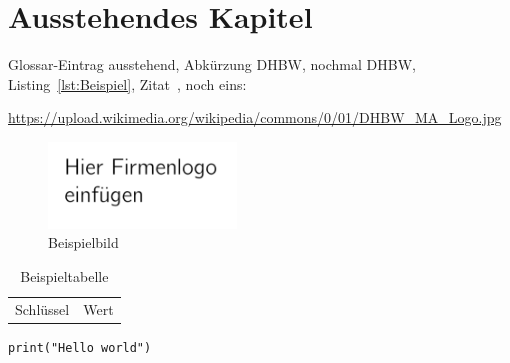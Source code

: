 \section{Ausstehendes Kapitel}

Glossar\hyp{}Eintrag \gls{ausstehend}, Abkürzung \ac{DHBW}, nochmal \ac{DHBW}, Listing~\ref{lst:Beispiel}, Zitat~\parencite[vgl.][S.~1\psq]{BookKey}, noch eins: \cite{OnlineKey}

\begin{sloppypar}
\url{https://upload.wikimedia.org/wikipedia/commons/0/01/DHBW_MA_Logo.jpg}
\end{sloppypar}

\begin{figure}
    \begin{center}
        \includegraphics[width=5cm]{img/logo.png}
        \caption{Beispielbild}
    \end{center}
\end{figure}

\begin{table}
    \begin{center}
        \begin{tabular}{ll}
            Schlüssel&Wert
        \end{tabular}
        \caption{Beispieltabelle}
    \end{center}
\end{table}

\begin{lstfloat}
\begin{lstlisting}
print("Hello world")
\end{lstlisting}
\end{lstfloat}
